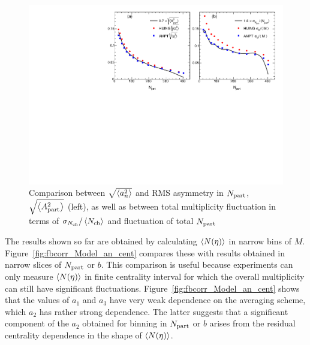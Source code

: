 \begin{figure}[H]
\centering
\includegraphics[width=.95\linewidth]{figs/chapter_fbcorr/Model_an_Anpart_comp.pdf}
\caption{Comparison between $\sqrt{\left\langle a_n^2\right\rangle}$ and RMS asymmetry in $N_\text{part}$, $\sqrt{\left\langle A_\text{part}^2\right\rangle}$ (left), as well as between total multiplicity fluctuation in terms of $\sigma_{N_\text{ch}} / \left\langle N_\text{ch}\right\rangle$ and fluctuation of total $N_\text{part}$}
\label{fig:fbcorr_Model_an_Anpart_comp}
\end{figure}

The results shown so far are obtained by calculating $\left\langle N(\eta)\right\rangle$ in narrow bins of $M$. Figure~\ref{fig:fbcorr_Model_an_cent} compares these with results obtained in narrow slices of $N_\text{part}$ or $b$. This comparison is useful because experiments can only measure $\left\langle N(\eta)\right\rangle$ in finite centrality interval for which the overall multiplicity can still have significant fluctuations. Figure~\ref{fig:fbcorr_Model_an_cent} shows that the values of $a_1$ and $a_3$ have very weak dependence on the averaging scheme, which $a_2$ has rather strong dependence. The latter suggests that a significant component of the $a_2$ obtained for binning in $N_\text{part}$ or $b$ arises from the residual centrality dependence in the shape of $\left\langle N(\eta)\right\rangle$.

